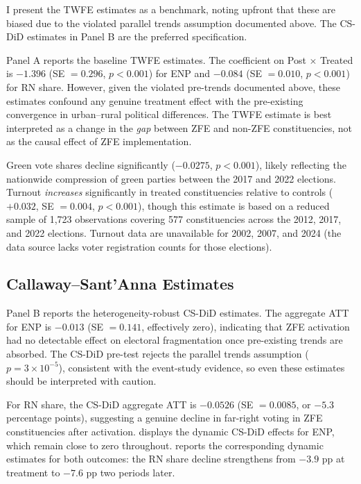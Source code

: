 \documentclass[12pt]{article}
\begin{document}
I present the TWFE estimates as a benchmark, noting upfront that these are biased due to the violated parallel trends assumption documented above. The CS-DiD estimates in Panel B are the preferred specification.

 Panel A reports the baseline TWFE estimates. The coefficient on Post $\times$ Treated is $-1.396$ (SE $= 0.296$, $p < 0.001$) for ENP and $-0.084$ (SE $= 0.010$, $p < 0.001$) for RN share. However, given the violated pre-trends documented above, these estimates confound any genuine treatment effect with the pre-existing convergence in urban--rural political differences. The TWFE estimate is best interpreted as a change in the \textit{gap} between ZFE and non-ZFE constituencies, not as the causal effect of ZFE implementation.

Green vote shares decline significantly ($-0.0275$, $p < 0.001$), likely reflecting the nationwide compression of green parties between the 2017 and 2022 elections. Turnout \textit{increases} significantly in treated constituencies relative to controls ($+0.032$, SE $= 0.004$, $p < 0.001$), though this estimate is based on a reduced sample of 1,723 observations covering 577 constituencies across the 2012, 2017, and 2022 elections. Turnout data are unavailable for 2002, 2007, and 2024 (the data source lacks voter registration counts for those elections).



\subsection{Callaway--Sant'Anna Estimates}

 Panel B reports the heterogeneity-robust CS-DiD estimates. The aggregate ATT for ENP is $-0.013$ (SE $= 0.141$, effectively zero), indicating that ZFE activation had no detectable effect on electoral fragmentation once pre-existing trends are absorbed. The CS-DiD pre-test rejects the parallel trends assumption ($p = 3 \times 10^{-5}$), consistent with the event-study evidence, so even these estimates should be interpreted with caution.

For RN share, the CS-DiD aggregate ATT is $-0.0526$ (SE $= 0.0085$, or $-5.3$ percentage points), suggesting a genuine decline in far-right voting in ZFE constituencies after activation.  displays the dynamic CS-DiD effects for ENP, which remain close to zero throughout.  reports the corresponding dynamic estimates for both outcomes: the RN share decline strengthens from $-3.9$ pp at treatment to $-7.6$ pp two periods later.
\end{document}
